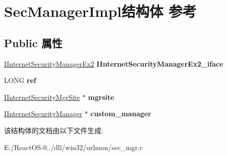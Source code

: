 \hypertarget{struct_sec_manager_impl}{}\section{Sec\+Manager\+Impl结构体 参考}
\label{struct_sec_manager_impl}
\subsection*{Public 属性}
\begin{DoxyCompactItemize}
\item 
\mbox{\label{struct_sec_manager_impl_ae9b2ddb09812057cc76705a13233af90}} 
\hyperlink{interface_i_internet_security_manager_ex2}{I\+Internet\+Security\+Manager\+Ex2} {\bfseries I\+Internet\+Security\+Manager\+Ex2\+\_\+iface}
\item 
\mbox{\label{struct_sec_manager_impl_aba8fae92edb211f9867dca634e5d38a3}} 
L\+O\+NG {\bfseries ref}
\item 
\mbox{\label{struct_sec_manager_impl_ac21a36c2ce98a23a3b59ba2308e30dc9}} 
\hyperlink{interface_i_internet_security_mgr_site}{I\+Internet\+Security\+Mgr\+Site} $\ast$ {\bfseries mgrsite}
\item 
\mbox{\label{struct_sec_manager_impl_abc1c3940ad8377bf425022269cd46b23}} 
\hyperlink{interface_i_internet_security_manager}{I\+Internet\+Security\+Manager} $\ast$ {\bfseries custom\+\_\+manager}
\end{DoxyCompactItemize}


该结构体的文档由以下文件生成\+:\begin{DoxyCompactItemize}
\item 
E\+:/\+React\+O\+S-\/0../dll/win32/urlmon/sec\+\_\+mgr.\+c\end{DoxyCompactItemize}
